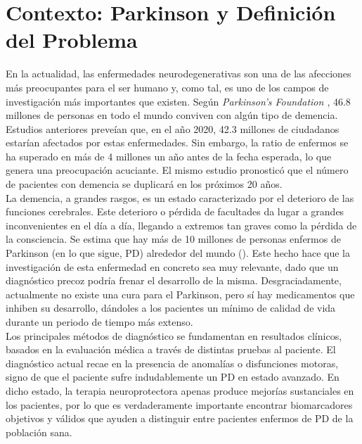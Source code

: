 	
	\maketitle %
	
	\newpage %
	
	\tableofcontents %
	
	\listoffigures
	
	\listoftables
	
	\newpage




\section{Contexto: Parkinson y Definición del Problema}

En la actualidad, las enfermedades neurodegenerativas son una de las afecciones más preocupantes para el ser humano y, como tal, es uno de los campos de investigación más importantes que existen. Según \textit{Parkinson's Foundation \cite{pf}}, 46.8 millones de personas en todo el mundo conviven con algún tipo de demencia. Estudios anteriores preveían que, en el año 2020, 42.3 millones de ciudadanos estarían afectados por estas enfermedades. Sin embargo, la ratio de enfermos se ha superado en más de 4 millones un año antes de la fecha esperada, lo que genera una preocupación acuciante. El mismo estudio pronosticó que el número de pacientes con demencia se duplicará en los próximos 20 años. \\

La demencia, a grandes rasgos, es un estado caracterizado por el deterioro de las funciones cerebrales. Este deterioro o pérdida de facultades da lugar a grandes inconvenientes en el día a día, llegando a extremos tan graves como la pérdida de la consciencia. Se estima que hay más de 10 millones de personas enfermos de Parkinson (en lo que sigue, PD) alrededor del mundo (\cite{wp}). Este hecho hace que la investigación de esta enfermedad en concreto sea muy relevante, dado que un diagnóstico precoz podría frenar el desarrollo de la misma. Desgraciadamente, actualmente no existe una cura para el Parkinson, pero sí hay medicamentos que inhiben su desarrollo, dándoles a los pacientes un mínimo de calidad de vida durante un periodo de tiempo más extenso. \\

Los principales métodos de diagnóstico se fundamentan en resultados clínicos, basados en la evaluación médica a través de distintas pruebas al paciente. El diagnóstico actual recae en la presencia de anomalías o disfunciones motoras, signo de que el paciente sufre indudablemente un PD en estado avanzado. En dicho estado, la terapia neuroprotectora apenas produce mejorías sustanciales en los pacientes, por lo que es verdaderamente importante encontrar biomarcadores objetivos y válidos que ayuden a distinguir entre pacientes enfermos de PD de la población sana. \\

